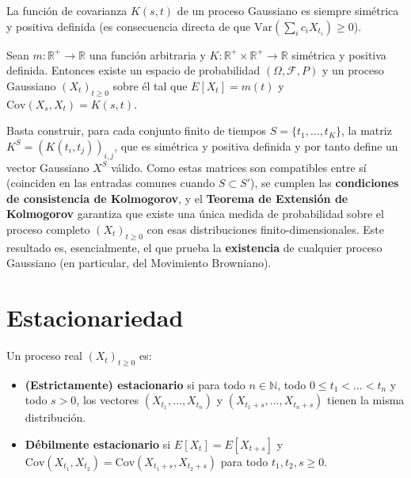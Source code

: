 \begin{prop}
La función de covarianza $K(s,t)$ de un proceso Gaussiano es siempre simétrica y positiva definida (es consecuencia directa de que $\text{Var}\left(\sum_i c_iX_{t_i}\right)\ge0$).
\end{prop}

\begin{teo}
Sean $m:\mathbb{R}^+\to\mathbb{R}$ una función arbitraria y $K:\mathbb{R}^+\times\mathbb{R}^+\to\mathbb{R}$ simétrica y positiva definida. Entonces existe un espacio de probabilidad $(\Omega,\mathcal{F},P)$ y un proceso Gaussiano $(X_t)_{t\ge0}$ sobre él tal que $E[X_t]=m(t)$ y $\text{Cov}(X_s,X_t)=K(s,t)$.
\end{teo}

\begin{observacion}
Basta construir, para cada conjunto finito de tiempos $S=\{t_1,\dots,t_K\}$, la matriz $K^S=(K(t_i,t_j))_{i,j}$, que es simétrica y positiva definida y por tanto define un vector Gaussiano $X^S$ válido. Como estas matrices son compatibles entre sí (coinciden en las entradas comunes cuando $S\subset S'$), se cumplen las \textbf{condiciones de consistencia de Kolmogorov}, y el \textbf{Teorema de Extensión de Kolmogorov} garantiza que existe una única medida de probabilidad sobre el proceso completo $(X_t)_{t\ge0}$ con esas distribuciones finito-dimensionales. Este resultado es, esencialmente, el que prueba la \textbf{existencia} de cualquier proceso Gaussiano (en particular, del Movimiento Browniano).
\end{observacion}

\section{Estacionariedad}

\begin{definicion}[Estacionariedad]
Un proceso real $(X_t)_{t\ge0}$ es:
\begin{itemize}
    \item \textbf{(Estrictamente) estacionario} si para todo $n\in\mathbb{N}$, todo $0\le t_1<\dots<t_n$ y todo $s>0$, los vectores $(X_{t_1},\dots,X_{t_n})$ y $(X_{t_1+s},\dots,X_{t_n+s})$ tienen la misma distribución.
    \item \textbf{Débilmente estacionario} si $E[X_t]=E[X_{t+s}]$ y $\text{Cov}(X_{t_1},X_{t_2}) = \text{Cov}(X_{t_1+s},X_{t_2+s})$ para todo $t_1,t_2,s\ge0$.
\end{itemize}
\end{definicion}

